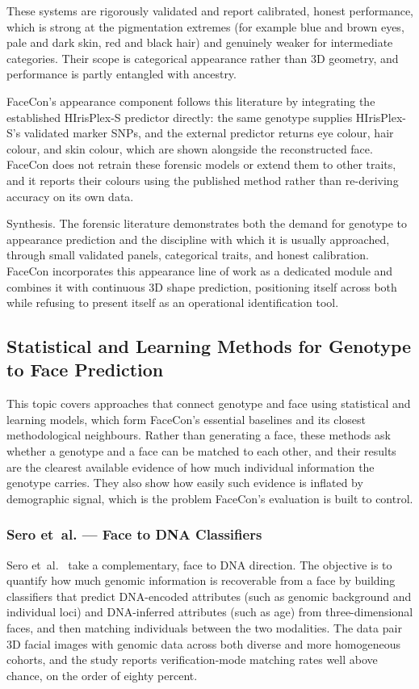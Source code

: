 These systems are rigorously validated and report calibrated, honest performance, which is strong at the pigmentation extremes (for example blue and brown eyes, pale and dark skin, red and black hair) and genuinely weaker for intermediate categories. Their scope is categorical appearance rather than 3D geometry, and performance is partly entangled with ancestry.

FaceCon's appearance component follows this literature by integrating the established HIrisPlex-S predictor directly: the same genotype supplies HIrisPlex-S's validated marker SNPs, and the external predictor returns eye colour, hair colour, and skin colour, which are shown alongside the reconstructed face. FaceCon does not retrain these forensic models or extend them to other traits, and it reports their colours using the published method rather than re-deriving accuracy on its own data.

Synthesis. The forensic literature demonstrates both the demand for genotype to appearance prediction and the discipline with which it is usually approached, through small validated panels, categorical traits, and honest calibration. FaceCon incorporates this appearance line of work as a dedicated module and combines it with continuous 3D shape prediction, positioning itself across both while refusing to present itself as an operational identification tool.

\subsection{Statistical and Learning Methods for Genotype to Face Prediction}
This topic covers approaches that connect genotype and face using statistical and learning models, which form FaceCon's essential baselines and its closest methodological neighbours. Rather than generating a face, these methods ask whether a genotype and a face can be matched to each other, and their results are the clearest available evidence of how much individual information the genotype carries. They also show how easily such evidence is inflated by demographic signal, which is the problem FaceCon's evaluation is built to control.

\subsubsection{Sero et~al. --- Face to DNA Classifiers}
Sero et~al.~\cite{ref:sero} take a complementary, face to DNA direction. The objective is to quantify how much genomic information is recoverable from a face by building classifiers that predict DNA-encoded attributes (such as genomic background and individual loci) and DNA-inferred attributes (such as age) from three-dimensional faces, and then matching individuals between the two modalities. The data pair 3D facial images with genomic data across both diverse and more homogeneous cohorts, and the study reports verification-mode matching rates well above chance, on the order of eighty percent.

